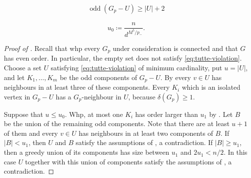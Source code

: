 \documentclass[10pt,a4paper]{amsart}
\newcommand{\odd}{\operatorname{odd}}
\begin{document}
\begin{align} \label{eq:tutte-violation}
    \odd(G_p - U) \geq |U|+2
\end{align}

\[
 u_0\coloneqq \frac{n}{d^{M^5/p_-}}.
\]


\begin{proof}[Proof of ]
Recall that whp every $G_p$ under consideration is connected and that $G$ has even order. In particular, the empty set does not satisfy \eqref{eq:tutte-violation}.
Choose a set $U$ satisfying \eqref{eq:tutte-violation} of minimum cardinality, put $u=|U|$, and let $K_1,\ldots,K_m$ be the odd components of $G_p-U$.
By  every $v\in U$ has neighbours in at least three of these components. 
Every $K_i$ which is an isolated vertex in $G_p-U$ has a $G_p$-neighbour in $U$, because $\delta(G_p)\ge1$.

Suppose that $u \leq u_0$.  
Whp, at most one $K_i$ has order larger than $u_1$ by . Let $B$ be the union of the remaining odd components. Note that there are at least $u+1$ of them and every $v\in U$ has neighbours in at least two components of $B$.
If $|B| < u_1$, then $U$ and $B$ satisfy the assumptions of , a contradiction.
If $|B|\geq u_1$, then a greedy union of its components has size between $u_1$ and $2u_1<n/2$. In this case $U$ together with this union of components satisfy the assumptions of , a contradiction.
\end{proof}







\end{document}
